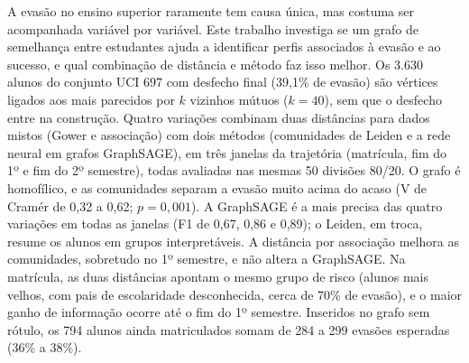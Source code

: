 A evasão no ensino superior raramente tem causa única, mas costuma ser acompanhada variável por variável. Este trabalho investiga se um grafo de semelhança entre estudantes ajuda a identificar perfis associados à evasão e ao sucesso, e qual combinação de distância e método faz isso melhor. Os 3.630 alunos do conjunto UCI 697 com desfecho final (39,1\% de evasão) são vértices ligados aos mais parecidos por $k$ vizinhos mútuos ($k = 40$), sem que o desfecho entre na construção. Quatro variações combinam duas distâncias para dados mistos (Gower e associação) com dois métodos (comunidades de Leiden e a rede neural em grafos GraphSAGE), em três janelas da trajetória (matrícula, fim do 1º e fim do 2º semestre), todas avaliadas nas mesmas 50 divisões 80/20. O grafo é homofílico, e as comunidades separam a evasão muito acima do acaso (V de Cramér de 0,32 a 0,62; $p = 0{,}001$). A GraphSAGE é a mais precisa das quatro variações em todas as janelas (F1 de 0,67, 0,86 e 0,89); o Leiden, em troca, resume os alunos em grupos interpretáveis. A distância por associação melhora as comunidades, sobretudo no 1º semestre, e não altera a GraphSAGE. Na matrícula, as duas distâncias apontam o mesmo grupo de risco (alunos mais velhos, com pais de escolaridade desconhecida, cerca de 70\% de evasão), e o maior ganho de informação ocorre até o fim do 1º semestre. Inseridos no grafo sem rótulo, os 794 alunos ainda matriculados somam de 284 a 299 evasões esperadas (36\% a 38\%).
